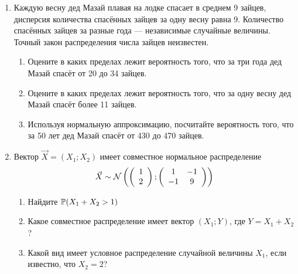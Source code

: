 \begin{enumerate}
\item Каждую весну дед Мазай плавая на лодке спасает в среднем 9 зайцев, дисперсия
количества спасённых зайцев за одну весну равна 9. Количество спасённых зайцев за
разные года — независимые случайные величины. Точный закон распределения числа зайцев
неизвестен.
\begin{enumerate}
\item Оцените в каких пределах лежит вероятность того, что за три года дед Мазай
спасёт от 20 до 34 зайцев.
\item Оцените в каких пределах лежит вероятность того, что за одну весну дед Мазай
спасёт более 11 зайцев.
\item Используя нормальную аппроксимацию, посчитайте вероятность того, что за 50
лет дед Мазай спасёт от 430 до 470 зайцев.
\end{enumerate}


\item Вектор $\vec{X}=(X_1;X_2)$ имеет совместное нормальное распределение
\[
\vec{X}\sim \cN\left(
\left(\begin{array}{l}
{1} \\
{2}
\end{array}\right);
\left(\begin{array}{cc}
{1} & {-1} \\
{-1} & {9}
\end{array}\right)
\right)
\]
\begin{enumerate}
\item Найдите $\P(X_1+X_2>1)$
\item Какое совместное распределение имеет вектор $(X_1; Y)$, где $Y = X_1 + X_2$?
\item Какой вид имеет условное распределение случайной величины $X_1$, если известно,
что $X_2 = 2$?
\end{enumerate}



\end{enumerate}
